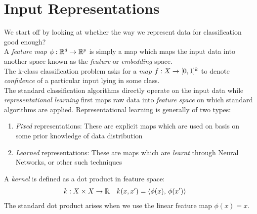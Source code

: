 \documentclass[11pt]{report}
\begin{document}


\maketitle



\section{Input Representations}

We start off by looking at whether the way we represent data for classification good enough?
\vspace{1mm}
\\A \emph{feature map} \(\phi :\mathbb{R}^d \rightarrow \mathbb{R}^p\) is simply a map which maps the input data into another space known as the \emph{feature} or \emph{embedding} space. 
\vspace{1mm}
\\The k-class classification problem asks for a \emph{map} \(f: X \rightarrow [0,1]^k\) to denote \emph{confidence} of a particular input lying in some class.
\vspace{1mm}
\\The standard classification algorithms directly operate on the input data while \emph{representational learning} first maps raw data into \emph{feature space} on which standard algorithms are applied. Representational learning is generally of two types:

\begin{enumerate}[label=\textup{(\alph*)}, leftmargin=*, widest=b, align=left]



\item \label{mpp:gen_a_0} \emph{Fixed} representations: These are explicit maps which are used on basis on some prior knowledge of data distribution
\item \label{mpp:gen_a_1} \emph{Learned} representations: These are maps which are \emph{learnt} through Neural Networks, or other such techniques

 \end{enumerate}
 \vspace{1mm}
A \emph{kernel} is defined as a dot product in feature space:
\begin{align}
    \begin{aligned}
     &k: X \times X \rightarrow \mathbb{R} && k(x,x')=\left\langle{\phi(x)},\,{\phi(x')}\right\rangle \nonumber
    \end{aligned}   
\end{align}
The standard dot product arises when we use the linear feature map \(\phi(x)=x\).
\end{document}
